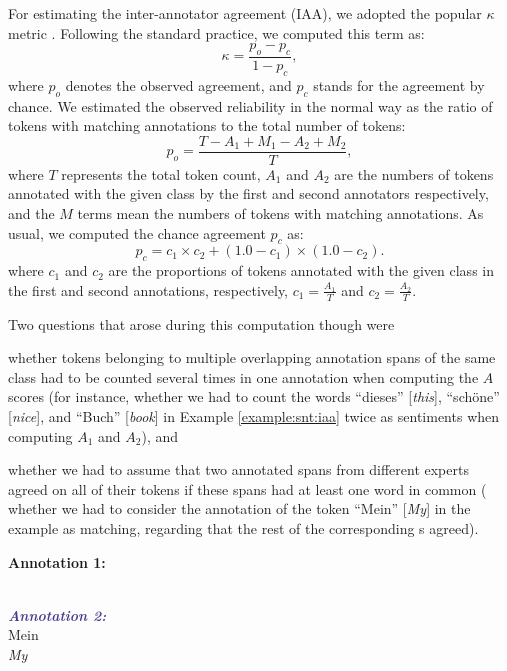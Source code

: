 For estimating the inter-annotator agreement (IAA), we adopted the
popular $\kappa$ metric \cite{Cohen:60}.  Following the standard
practice, we computed this term as:
\begin{equation*}
  \kappa = \frac{p_o - p_c}{1 - p_c},
\end{equation*}
where $p_o$ denotes the observed agreement, and $p_c$ stands for the
agreement by chance.  We estimated the observed reliability in the
normal way as the ratio of tokens with matching annotations to the
total number of tokens:
\begin{equation*}
  p_o = \frac{T - A_1 + M_1 - A_2 + M_2}{T},
\end{equation*}
where $T$ represents the total token count, $A_1$ and $A_2$ are the
numbers of tokens annotated with the given class by the first and
second annotators respectively, and the $M$ terms mean the numbers of
tokens with matching annotations.  As usual, we computed the chance
agreement $p_c$ as:
\begin{equation*}\textstyle
  p_c = c_1 \times c_2 + (1.0 - c_1) \times (1.0 - c_2).
\end{equation*}
where $c_1$ and $c_2$ are the proportions of tokens annotated with the
given class in the first and second annotations, respectively, \ie{}
$c_1 = \frac{A_1}{T}$ and $c_2 = \frac{A_2}{T}$.

Two questions that arose during this computation though were
\begin{inparaenum}[(i)]
  \item whether tokens belonging to multiple overlapping annotation
    spans of the same class had to be counted several times in one
    annotation when computing the $A$ scores (for instance, whether we
    had to count the words ``dieses'' [\textit{this}], ``sch\"one''
    [\textit{nice}], and ``Buch'' [\textit{book}] in Example
    \ref{example:snt:iaa} twice as sentiments when computing $A_1$ and
    $A_2$), and
  \item whether we had to assume that two annotated spans from
    different experts agreed on all of their tokens if these spans had
    at least one word in common (\eg{} whether we had to consider the
    annotation of the token ``Mein'' [\textit{My}] in the example as
    matching, regarding that the rest of the corresponding
    s agreed).
\end{inparaenum}

\begin{example}\label{example:snt:iaa}
\textcolor{red3}{\textbf{Annotation 1:}}\\
\upshape{}\\

\noindent\textcolor{darkslateblue}{\textbf{\itshape Annotation 2:}}\\
Mein \\
\itshape My \upshape{}
\end{example}

